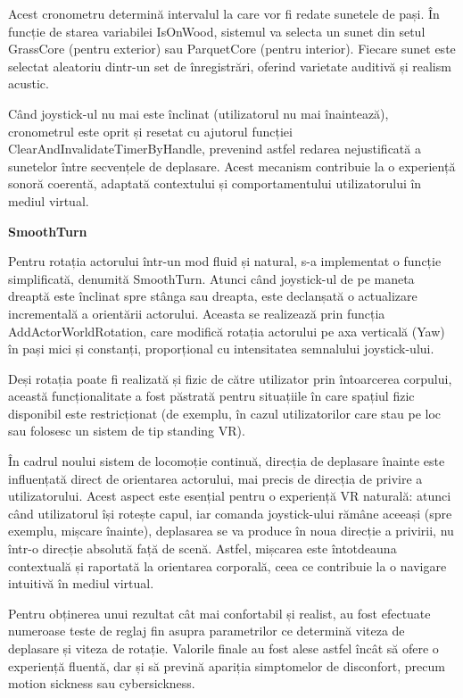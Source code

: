 Acest cronometru determină intervalul la care vor fi redate sunetele de pași. În funcție de starea variabilei IsOnWood, sistemul va selecta un sunet din setul GrassCore (pentru exterior) sau ParquetCore (pentru interior). Fiecare sunet este selectat aleatoriu dintr-un set de înregistrări, oferind varietate auditivă și realism acustic.

Când joystick-ul nu mai este înclinat (utilizatorul nu mai înaintează), cronometrul este oprit și resetat cu ajutorul funcției ClearAndInvalidateTimerByHandle, prevenind astfel redarea nejustificată a sunetelor între secvențele de deplasare. Acest mecanism contribuie la o experiență sonoră coerentă, adaptată contextului și comportamentului utilizatorului în mediul virtual.

\textbf{SmoothTurn}

Pentru rotația actorului într-un mod fluid și natural, s-a implementat o funcție simplificată, denumită SmoothTurn. Atunci când joystick-ul de pe maneta dreaptă este înclinat spre stânga sau dreapta, este declanșată o actualizare incrementală a orientării actorului. Aceasta se realizează prin funcția AddActorWorldRotation, care modifică rotația actorului pe axa verticală (Yaw) în pași mici și constanți, proporțional cu intensitatea semnalului joystick-ului.

Deși rotația poate fi realizată și fizic de către utilizator prin întoarcerea corpului, această funcționalitate a fost păstrată pentru situațiile în care spațiul fizic disponibil este restricționat (de exemplu, în cazul utilizatorilor care stau pe loc sau folosesc un sistem de tip standing VR).

În cadrul noului sistem de locomoție continuă, direcția de deplasare înainte este influențată direct de orientarea actorului, mai precis de direcția de privire a utilizatorului. Acest aspect este esențial pentru o experiență VR naturală: atunci când utilizatorul își rotește capul, iar comanda joystick-ului rămâne aceeași (spre exemplu, mișcare înainte), deplasarea se va produce în noua direcție a privirii, nu într-o direcție absolută față de scenă. Astfel, mișcarea este întotdeauna contextuală și raportată la orientarea corporală, ceea ce contribuie la o navigare intuitivă în mediul virtual.

Pentru obținerea unui rezultat cât mai confortabil și realist, au fost efectuate numeroase teste de reglaj fin asupra parametrilor ce determină viteza de deplasare și viteza de rotație. Valorile finale au fost alese astfel încât să ofere o experiență fluentă, dar și să prevină apariția simptomelor de disconfort, precum motion sickness sau cybersickness.

